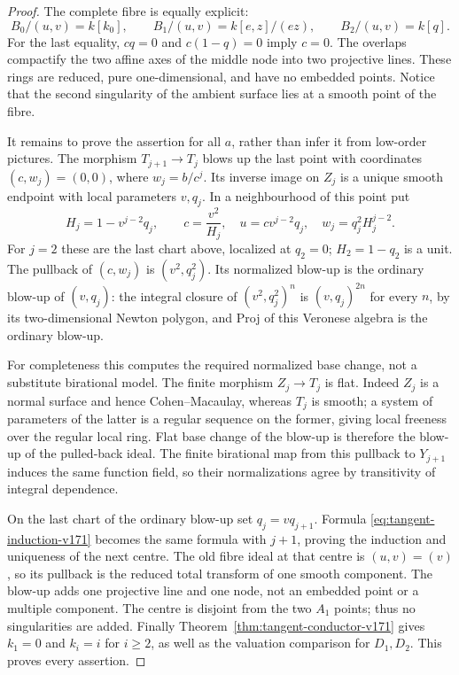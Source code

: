 \documentclass[11pt,reqno]{amsart}
\numberwithin{equation}{section}
\theoremstyle{definition}\newtheorem{definition}[theorem]{Definition}
\theoremstyle{remark}\newtheorem{remark}[theorem]{Remark}
\begin{document}
\begin{proof}
The complete fibre is equally explicit:
\begin{equation}\label{eq:square-full-fibre-v171}
 B_0/(u,v)=k[k_0],\qquad
 B_1/(u,v)=k[e,z]/(ez),\qquad
 B_2/(u,v)=k[q].
\end{equation}
For the last equality, $cq=0$ and $c(1-q)=0$ imply $c=0$.
The overlaps compactify the two affine axes of the middle node into
two projective lines. These rings are reduced, pure one-dimensional,
and have no embedded points. Notice that the second singularity of
the ambient surface lies at a smooth point of the fibre.

It remains to prove the assertion for all $a$, rather than infer it
from low-order pictures. The morphism $T_{j+1}\to T_j$ blows up the
last point with coordinates $(c,w_j)=(0,0)$, where $w_j=b/c^j$.
Its inverse image on $Z_j$ is a unique smooth endpoint with local
parameters $v,q_j$. In a neighbourhood of this point put
\begin{equation}\label{eq:tangent-induction-v171}
 H_j=1-v^{j-2}q_j,\qquad
 c=\frac{v^2}{H_j},\quad
 u=c v^{j-2}q_j,\quad
 w_j=q_j^2H_j^{j-2}.
\end{equation}
For $j=2$ these are the last chart above, localized at $q_2=0$;
$H_2=1-q_2$ is a unit. The pullback of $(c,w_j)$ is
$(v^2,q_j^2)$. Its normalized blow-up is the ordinary blow-up of
$(v,q_j)$: the integral closure of $(v^2,q_j^2)^n$ is
$(v,q_j)^{2n}$ for every $n$, by its two-dimensional Newton polygon,
and Proj of this Veronese algebra is the ordinary blow-up.

For completeness this computes the required normalized base change,
not a substitute birational model. The finite morphism $Z_j\to T_j$
is flat. Indeed $Z_j$ is a normal surface and hence Cohen--Macaulay,
whereas $T_j$ is smooth; a system of parameters of the latter is a
regular sequence on the former, giving local freeness over the
regular local ring. Flat base change of the blow-up is therefore the
blow-up of the pulled-back ideal. The finite birational map from this
pullback to $Y_{j+1}$ induces the same function field, so their
normalizations agree by transitivity of integral dependence.

On the last chart of the ordinary blow-up set $q_j=vq_{j+1}$.
Formula \eqref{eq:tangent-induction-v171} becomes the same formula
with $j+1$, proving the induction and uniqueness of the next centre.
The old fibre ideal at that centre is $(u,v)=(v)$, so its pullback is
the reduced total transform of one smooth component. The blow-up adds
one projective line and one node, not an embedded point or a multiple
component. The centre is disjoint from the two $A_1$ points; thus
no singularities are added. Finally Theorem~\ref{thm:tangent-conductor-v171}
gives $k_1=0$ and $k_i=i$ for $i\geq2$, as well as the valuation
comparison for $D_1,D_2$. This proves every assertion.
\end{proof}
\end{document}

